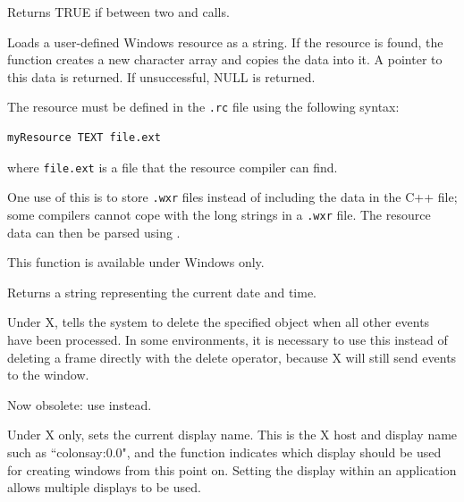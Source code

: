 
Returns TRUE if between two  and\rtfsp
{} calls.

\label{wxloaduserresource}


Loads a user-defined Windows resource as a string. If the resource is found, the function creates
a new character array and copies the data into it. A pointer to this data is returned. If unsuccessful, NULL is returned.

The resource must be defined in the {\tt .rc} file using the following syntax:

\begin{verbatim}
myResource TEXT file.ext
\end{verbatim}

where {\tt file.ext} is a file that the resource compiler can find.

One use of this is to store {\tt .wxr} files instead of including the data in the C++ file; some compilers
cannot cope with the long strings in a {\tt .wxr} file. The resource data can then be parsed
using .

This function is available under Windows only.

\label{wxnow}


Returns a string representing the current date and time.

\label{wxpostdelete}


Under X, tells the system to delete the specified object when
all other events have been processed. In some environments, it is
necessary to use this instead of deleting a frame directly with the
delete operator, because X will still send events to the window.

Now obsolete: use  instead.

\label{wxsetdisplayname}


Under X only, sets the current display name. This is the X host and display name such
as ``colonsay:0.0", and the function indicates which display should be used for creating
windows from this point on. Setting the display within an application allows multiple
displays to be used.


